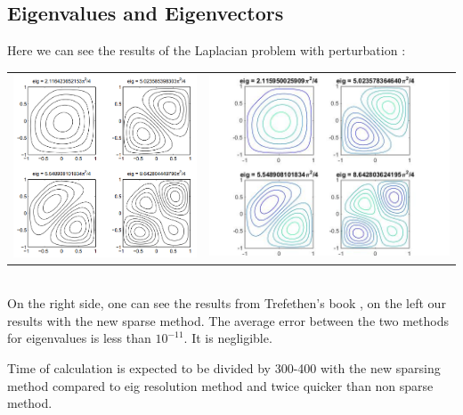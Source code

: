 \documentclass[ border=0pt, a4paper, 11pt]{article}
\numberwithin{equation}{section}
\begin{document}
\subsection{ Eigenvalues and Eigenvectors}
Here we can see the results of the Laplacian problem with perturbation :\\
\begin{tabular}{cc}
   \includegraphics[width=8cm]{eigenvalue_perrtub.PNG} &
   \includegraphics[width=10.5cm]{eigenvalue_sparse.jpg} \\
\end{tabular}\\
On the right side, one can see the results from Trefethen's book , on the left our results with the new sparse method.
The average error between the two methods for eigenvalues is less than $10^{-11}$. It is negligible.

Time of calculation is expected to be divided by 300-400 with the new sparsing method compared to eig resolution method and twice quicker than non sparse method.
\end{document}

